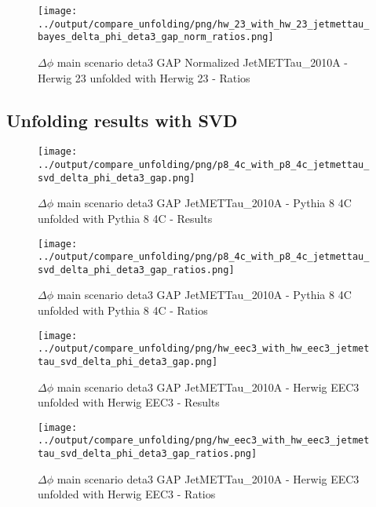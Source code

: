 \documentclass[11pt]{book}
\begin{document}
\begin{figure}[ht]
\centering
\texttt{[image: ../output/compare\_unfolding/png/hw\_23\_with\_hw\_23\_jetmettau\_bayes\_delta\_phi\_deta3\_gap\_norm\_ratios.png]}
\caption{$\Delta\phi$ main scenario deta3 GAP Normalized JetMETTau\_2010A - Herwig 23 unfolded with Herwig 23 - Ratios}
\label{hw_23_hw_23_jetmettau_bayes_delta_phi_deta3_gap_norm_b}
\end{figure}



\clearpage
\subsection{Unfolding results with SVD}

\begin{figure}[ht]
\centering
\texttt{[image: ../output/compare\_unfolding/png/p8\_4c\_with\_p8\_4c\_jetmettau\_svd\_delta\_phi\_deta3\_gap.png]}
\caption{$\Delta\phi$ main scenario deta3 GAP JetMETTau\_2010A - Pythia 8 4C unfolded with Pythia 8 4C - Results}
\label{p8_p8_jetmettau_svd_delta_phi_deta3_gap_a}
\end{figure}

\begin{figure}[ht]
\centering
\texttt{[image: ../output/compare\_unfolding/png/p8\_4c\_with\_p8\_4c\_jetmettau\_svd\_delta\_phi\_deta3\_gap\_ratios.png]}
\caption{$\Delta\phi$ main scenario deta3 GAP JetMETTau\_2010A - Pythia 8 4C unfolded with Pythia 8 4C - Ratios}
\label{p8_p8_jetmettau_svd_delta_phi_deta3_gap_b}
\end{figure}

\begin{figure}[ht]
\centering
\texttt{[image: ../output/compare\_unfolding/png/hw\_eec3\_with\_hw\_eec3\_jetmettau\_svd\_delta\_phi\_deta3\_gap.png]}
\caption{$\Delta\phi$ main scenario deta3 GAP JetMETTau\_2010A - Herwig EEC3 unfolded with Herwig EEC3 - Results}
\label{hw_eec3_hw_eec3_jetmettau_svd_delta_phi_deta3_gap_a}
\end{figure}

\begin{figure}[ht]
\centering
\texttt{[image: ../output/compare\_unfolding/png/hw\_eec3\_with\_hw\_eec3\_jetmettau\_svd\_delta\_phi\_deta3\_gap\_ratios.png]}
\caption{$\Delta\phi$ main scenario deta3 GAP JetMETTau\_2010A - Herwig EEC3 unfolded with Herwig EEC3 - Ratios}
\label{hw_eec3_hw_eec3_jetmettau_svd_delta_phi_deta3_gap_b}
\end{figure}
\end{document}
